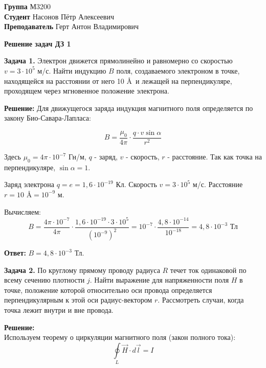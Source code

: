 \documentclass[10pt]{article}
\begin{document}
	
	\textbf{Группа} М3200 \hfill\\[0.5cm]
	\textbf{Студент} Насонов Пётр Алексеевич \hfill  \\[0.5cm]
	\textbf{Преподаватель} Герт Антон Владимирович \hfill \\
	
	\vspace{1cm}
	
	\begin{center}
		{\LARGE \textbf{Решение задач ДЗ 1}}
	\end{center}
	
	\vspace{1cm}

\textbf{Задача 1.} Электрон движется прямолинейно и равномерно со скоростью $v=3 \cdot 10^5$ м/с. Найти индукцию $B$ поля, создаваемого электроном в точке, находящейся на расстоянии от него 10 \AA~и лежащей на перпендикуляре, проходящем через мгновенное положение электрона.

\textbf{Решение:}
Для движущегося заряда индукция магнитного поля определяется по закону Био-Савара-Лапласа:

$$B = \frac{\mu_0}{4\pi} \cdot \frac{q \cdot v \sin\alpha}{r^2}$$

Здесь $\mu_0 = 4\pi \cdot 10^{-7}$ Гн/м, $q$ - заряд, $v$ - скорость, $r$ - расстояние.
Так как точка на перпендикуляре, $\sin\alpha = 1$.

Заряд электрона $q = e = 1,6 \cdot 10^{-19}$ Кл.
Скорость $v = 3 \cdot 10^5$ м/с.
Расстояние $r = 10$ \AA $ = 10^{-9}$ м.

Вычисляем:
$$B = \frac{4\pi \cdot 10^{-7}}{4\pi} \cdot \frac{1,6 \cdot 10^{-19} \cdot 3 \cdot 10^5}{(10^{-9})^2} = 10^{-7} \cdot \frac{4,8 \cdot 10^{-14}}{10^{-18}} = 4,8 \cdot 10^{-3} \text{ Тл}$$

\textbf{Ответ:} $B = 4,8 \cdot 10^{-3}$ Тл.

\vspace{0.8cm}

\textbf{Задача 2.} По круглому прямому проводу радиуса $R$ течет ток одинаковой по всему сечению плотности $j$. Найти выражение для напряженности поля $H$ в точке, положение которой относительно оси провода определяется перпендикулярным к этой оси радиус-вектором $r$. Рассмотреть случаи, когда точка лежит внутри и вне провода.

\textbf{Решение:} \\
Используем теорему о циркуляции магнитного поля (закон полного тока):
$$\oint\limits_L \vec{H} \cdot d\vec{l} = I$$
\end{document}

